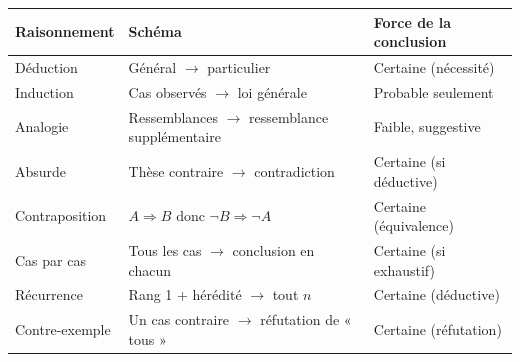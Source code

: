 \documentclass[11pt]{article}
\begin{document}
\begin{center}
\begin{tabularx}{\linewidth}{|l|X|X|}
\hline
\rowcolor{popblueL} \textbf{Raisonnement} & \textbf{Schéma} & \textbf{Force de la conclusion} \\
\hline
Déduction & Général $\rightarrow$ particulier & Certaine (nécessité) \\
\hline
Induction & Cas observés $\rightarrow$ loi générale & Probable seulement \\
\hline
Analogie & Ressemblances $\rightarrow$ ressemblance supplémentaire & Faible, suggestive \\
\hline
Absurde & Thèse contraire $\rightarrow$ contradiction & Certaine (si déductive) \\
\hline
Contraposition & $A \Rightarrow B$ donc $\neg B \Rightarrow \neg A$ & Certaine (équivalence) \\
\hline
Cas par cas & Tous les cas $\rightarrow$ conclusion en chacun & Certaine (si exhaustif) \\
\hline
Récurrence & Rang 1 + hérédité $\rightarrow$ tout $n$ & Certaine (déductive) \\
\hline
Contre-exemple & Un cas contraire $\rightarrow$ réfutation de « tous » & Certaine (réfutation) \\
\hline
\end{tabularx}
\end{center}
\end{document}
